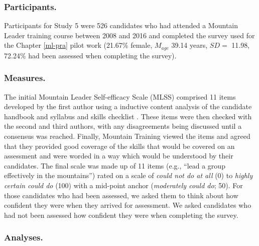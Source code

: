 \documentclass[
  12pt,
  a4paper,
]{book}
\begin{document}
\hypertarget{study-5-participants}{%
\subsubsection{Participants.}\label{study-5-participants}}

Participants for Study 5 were 526 candidates who had attended a Mountain Leader training course between 2008 and 2016 and completed the survey used for the Chapter \ref{ml-pra} pilot work (21.67\% female, \(M_{age}\) 39.14 years, \(SD =\) 11.98, 72.24\% had been assessed when completing the survey).

\hypertarget{study-5-measures}{%
\subsubsection{Measures.}\label{study-5-measures}}

The initial Mountain Leader Self-efficacy Scale (MLSS) comprised 11 items developed by the first author using a inductive content analysis \citep{Cho2014} of the candidate handbook and syllabus \citep{MountainTrainingUK2015a} and skills checklist \citep{MountainTrainingUK2015}. These items were then checked with the second and third authors, with any disagreements being discussed until a consensus was reached. Finally, Mountain Training viewed the items and agreed that they provided good coverage of the skills that would be covered on an assessment and were worded in a way which would be understood by their candidates. The final scale was made up of 11 items (e.g., ``lead a group effectively in the mountains'') rated on a scale of \emph{could not do at all} (0) to \emph{highly certain could do} (100) with a mid-point anchor (\emph{moderately could do}; 50). For those candidates who had been assessed, we asked them to think about how confident they were when they arrived for assessment. We asked candidates who had not been assessed how confident they were when completing the survey.

\hypertarget{study-5-analyses}{%
\subsubsection{Analyses.}\label{study-5-analyses}}
\end{document}
